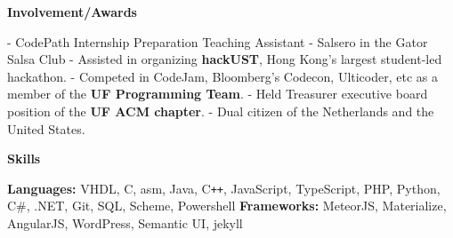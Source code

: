 \documentclass[letterpaper,10pt]{article}
\newcommand{\resheading}[1]{{\large \colorbox{mygrey}{\begin{minipage}{\textwidth}{\textbf{#1 \vphantom{p\^{E}}}}\end{minipage}}}}
\begin{document}
\resheading{Involvement/Awards}

\begin{description}
- CodePath Internship Preparation Teaching Assistant\newline
- Salsero in the Gator Salsa Club \newline
- Assisted in organizing \textbf{hackUST}, Hong Kong's largest student-led hackathon. \newline
- Competed in CodeJam, Bloomberg's Codecon, Ulticoder, etc as a member of the \textbf{UF Programming Team}. \newline
- Held Treasurer executive board position of the \textbf{UF ACM chapter}.\newline
- Dual citizen of the Netherlands and the United States.
\end{description}

\resheading{Skills}

\begin{description}
\textbf{Languages:} \tabto{2.5cm} VHDL, C, asm, Java, C{}\verb!++!, JavaScript, TypeScript, PHP, Python, C\#, .NET, Git, SQL, Scheme, Powershell\newline
\textbf{Frameworks:} \tabto{2.5cm} MeteorJS, Materialize, AngularJS, WordPress, Semantic UI, jekyll
\end{description}
\end{document}
